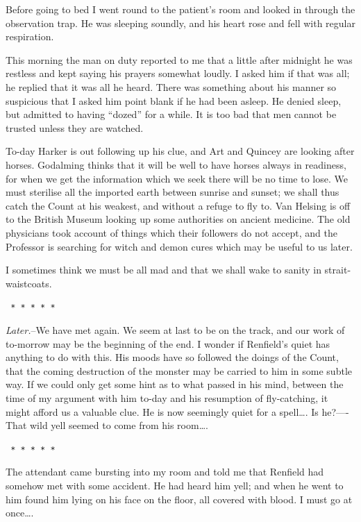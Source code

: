 \documentclass[12pt,openright]{book}
\begin{document}
Before going to bed I went round to the patient’s room and looked in through the observation trap. He was sleeping soundly, and his heart rose and fell with regular respiration.

This morning the man on duty reported to me that a little after midnight he was restless and kept saying his prayers somewhat loudly. I asked him if that was all; he replied that it was all he heard. There was something about his manner so suspicious that I asked him point blank if he had been asleep. He denied sleep, but admitted to having “dozed” for a while. It is too bad that men cannot be trusted unless they are watched.

To-day Harker is out following up his clue, and Art and Quincey are looking after horses. Godalming thinks that it will be well to have horses always in readiness, for when we get the information which we seek there will be no time to lose. We must sterilise all the imported earth between sunrise and sunset; we shall thus catch the Count at his weakest, and without a refuge to fly to. Van Helsing is off to the British Museum looking up some authorities on ancient medicine. The old physicians took account of things which their followers do not accept, and the Professor is searching for witch and demon cures which may be useful to us later.

I sometimes think we must be all mad and that we shall wake to sanity in strait-waistcoats.

\texttt{   *       *       *       *       *}

\textit{Later.}–We have met again. We seem at last to be on the track, and our work of to-morrow may be the beginning of the end. I wonder if Renfield’s quiet has anything to do with this. His moods have so followed the doings of the Count, that the coming destruction of the monster may be carried to him in some subtle way. If we could only get some hint as to what passed in his mind, between the time of my argument with him to-day and his resumption of fly-catching, it might afford us a valuable clue. He is now seemingly quiet for a spell…. Is he?—- That wild yell seemed to come from his room….

\texttt{   *       *       *       *       *}

The attendant came bursting into my room and told me that Renfield had somehow met with some accident. He had heard him yell; and when he went to him found him lying on his face on the floor, all covered with blood. I must go at once….
\end{document}
